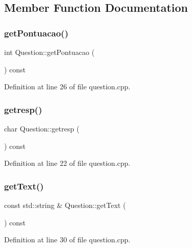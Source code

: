 \subsection{Member Function Documentation}
\mbox{\label{class_question_abbb1bb09b9ff8bc741a15d548034a7df}} 
\subsubsection{\texorpdfstring{get\+Pontuacao()}{getPontuacao()}}
{\footnotesize\ttfamily int Question\+::get\+Pontuacao (\begin{DoxyParamCaption}{ }\end{DoxyParamCaption}) const}



Definition at line 26 of file question.\+cpp.

\mbox{\label{class_question_a7dbb3a08bcdb160f0f9c1b568af9fe48}} 
\subsubsection{\texorpdfstring{getresp()}{getresp()}}
{\footnotesize\ttfamily char Question\+::getresp (\begin{DoxyParamCaption}{ }\end{DoxyParamCaption}) const}



Definition at line 22 of file question.\+cpp.

\mbox{\label{class_question_afea6ba74d117b00cd5fbca8fa1e2552c}} 
\subsubsection{\texorpdfstring{get\+Text()}{getText()}}
{\footnotesize\ttfamily const std\+::string \& Question\+::get\+Text (\begin{DoxyParamCaption}{ }\end{DoxyParamCaption}) const}



Definition at line 30 of file question.\+cpp.

